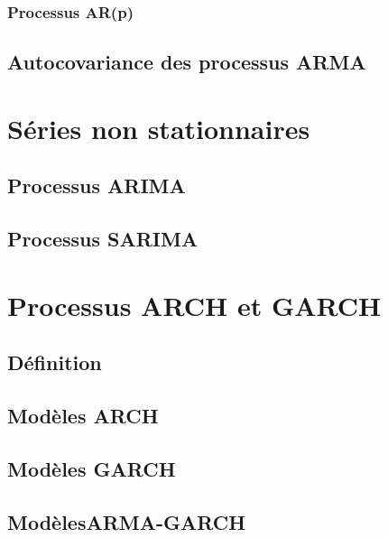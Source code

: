 \documentclass[
]{book}
\theoremstyle{definition}
\theoremstyle{definition}
\theoremstyle{definition}
\theoremstyle{definition}
\theoremstyle{remark}
\begin{document}
\hypertarget{processus-arp}{%
\subsection{Processus AR(p)}\label{processus-arp}}

\hypertarget{autocovariance-des-processus-arma}{%
\section{Autocovariance des processus ARMA}\label{autocovariance-des-processus-arma}}

\hypertarget{proc-non-stat}{%
\chapter{Séries non stationnaires}\label{proc-non-stat}}

\hypertarget{processus-arima}{%
\section{Processus ARIMA}\label{processus-arima}}

\hypertarget{processus-sarima}{%
\section{Processus SARIMA}\label{processus-sarima}}

\hypertarget{ARCH-GARCH}{%
\chapter{Processus ARCH et GARCH}\label{ARCH-GARCH}}

\hypertarget{duxe9finition-6}{%
\section{Définition}\label{duxe9finition-6}}

\hypertarget{moduxe8les-arch}{%
\section{Modèles ARCH}\label{moduxe8les-arch}}

\hypertarget{moduxe8les-garch}{%
\section{Modèles GARCH}\label{moduxe8les-garch}}

\hypertarget{moduxe8lesarma-garch}{%
\section{ModèlesARMA-GARCH}\label{moduxe8lesarma-garch}}

  
\end{document}
